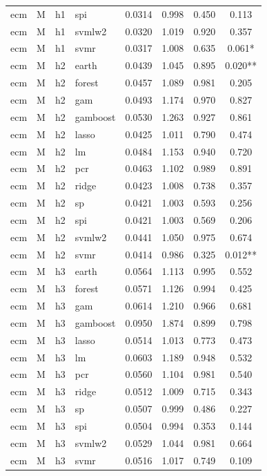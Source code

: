 \begin{ThreePartTable}
\begin{longtable}[t]{llclcccc}
ecm & M & h1 & spi & 0.0314 & 0.998 & 0.450 & 0.113\\
ecm & M & h1 & svmlw2 & 0.0320 & 1.019 & 0.920 & 0.357\\
ecm & M & h1 & svmr & 0.0317 & 1.008 & 0.635 & 0.061*\\
\addlinespace
ecm & M & h2 & earth & 0.0439 & 1.045 & 0.895 & 0.020**\\
ecm & M & h2 & forest & 0.0457 & 1.089 & 0.981 & 0.205\\
ecm & M & h2 & gam & 0.0493 & 1.174 & 0.970 & 0.827\\
ecm & M & h2 & gamboost & 0.0530 & 1.263 & 0.927 & 0.861\\
ecm & M & h2 & lasso & 0.0425 & 1.011 & 0.790 & 0.474\\
ecm & M & h2 & lm & 0.0484 & 1.153 & 0.940 & 0.720\\
ecm & M & h2 & pcr & 0.0463 & 1.102 & 0.989 & 0.891\\
ecm & M & h2 & ridge & 0.0423 & 1.008 & 0.738 & 0.357\\
ecm & M & h2 & sp & 0.0421 & 1.003 & 0.593 & 0.256\\
ecm & M & h2 & spi & 0.0421 & 1.003 & 0.569 & 0.206\\
ecm & M & h2 & svmlw2 & 0.0441 & 1.050 & 0.975 & 0.674\\
ecm & M & h2 & svmr & 0.0414 & 0.986 & 0.325 & 0.012**\\
\addlinespace
ecm & M & h3 & earth & 0.0564 & 1.113 & 0.995 & 0.552\\
ecm & M & h3 & forest & 0.0571 & 1.126 & 0.994 & 0.425\\
ecm & M & h3 & gam & 0.0614 & 1.210 & 0.966 & 0.681\\
ecm & M & h3 & gamboost & 0.0950 & 1.874 & 0.899 & 0.798\\
ecm & M & h3 & lasso & 0.0514 & 1.013 & 0.773 & 0.473\\
ecm & M & h3 & lm & 0.0603 & 1.189 & 0.948 & 0.532\\
ecm & M & h3 & pcr & 0.0560 & 1.104 & 0.981 & 0.540\\
ecm & M & h3 & ridge & 0.0512 & 1.009 & 0.715 & 0.343\\
ecm & M & h3 & sp & 0.0507 & 0.999 & 0.486 & 0.227\\
ecm & M & h3 & spi & 0.0504 & 0.994 & 0.353 & 0.144\\
ecm & M & h3 & svmlw2 & 0.0529 & 1.044 & 0.981 & 0.664\\
ecm & M & h3 & svmr & 0.0516 & 1.017 & 0.749 & 0.109\\

\end{longtable}
\end{ThreePartTable}
